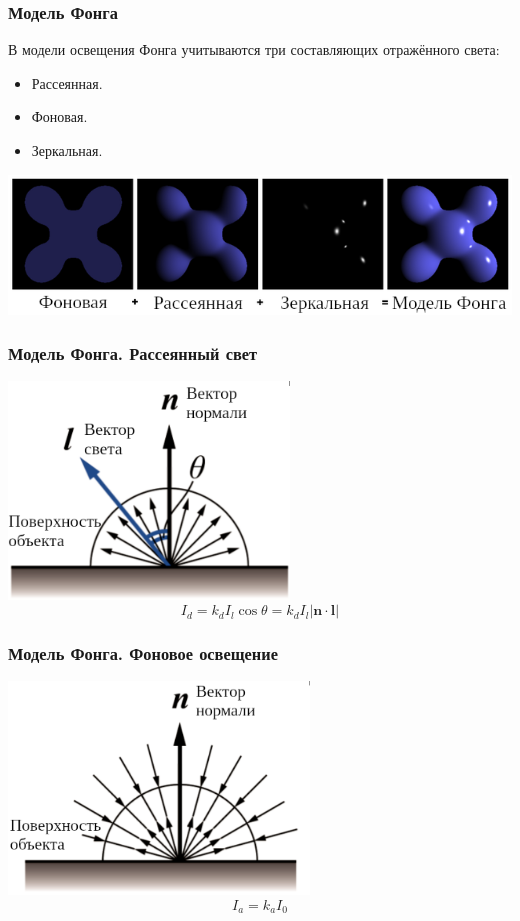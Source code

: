 \documentclass{beamer}
\begin{document}
\begin{frame}
\frametitle{Модель Фонга}
В модели освещения Фонга учитываются три составляющих отражённого света:

\begin{itemize}
    \item Рассеянная.
    \item Фоновая.
    \item Зеркальная.
\end{itemize}
\centering
\includegraphics[width=1\textwidth]{img/phong-components}
\end{frame}

\begin{frame}
\frametitle{Модель Фонга. Рассеянный свет}
\centering
\includegraphics[width=0.56\textwidth]{img/diffuse_ru}
\begin{equation}
    I_d = k_d I_l \cos \theta = k_d I_l \left| \boldsymbol{n} \cdot \boldsymbol{l} \right|
    \label{eq:diffuse}
\end{equation}
\end{frame}

\begin{frame}
\frametitle{Модель Фонга. Фоновое освещение}
\centering
\includegraphics[width=0.6\textwidth]{img/ambient_ru}
\begin{equation}
    I_a = k_a I_0
    \label{eq:ambient}
\end{equation}
\end{frame}
\end{document}
